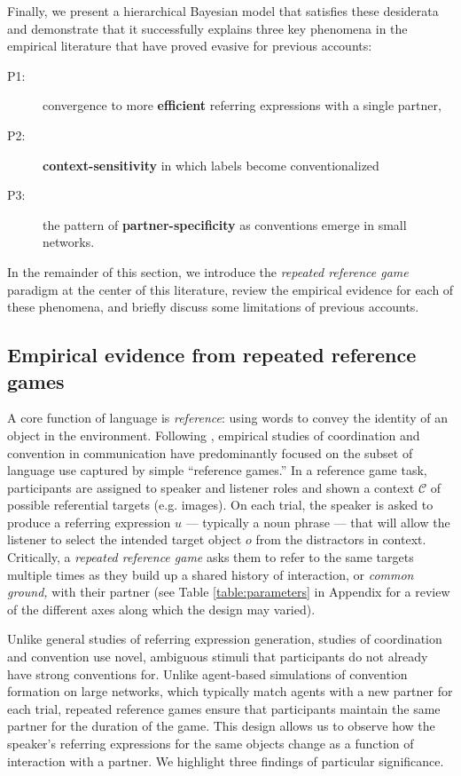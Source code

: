 Finally, we present a hierarchical Bayesian model that satisfies these desiderata and demonstrate that it successfully explains three key phenomena in the empirical literature that have proved evasive for previous accounts: 
\begin{description}
\item[P1:] convergence to more \textbf{efficient} referring expressions with a single partner, 
\item[P2:] \textbf{context-sensitivity} in which labels become conventionalized
\item[P3:] the pattern of \textbf{partner-specificity} as conventions emerge in small networks.
\end{description}
In the remainder of this section, we introduce the \emph{repeated reference game} paradigm at the center of this literature, review the empirical evidence for each of these phenomena, and briefly discuss some limitations of previous accounts.

\subsection{Empirical evidence from repeated reference games}

A core function of language is \emph{reference}: using words to convey the identity of an object in the environment. 
Following , empirical studies of coordination and convention in communication have predominantly focused on the subset of language use captured by simple ``reference games.'' 
In a reference game task, participants are assigned to speaker and listener roles and shown a context $\mathcal{C}$ of possible referential targets (e.g. images).
On each trial, the speaker is asked to produce a referring expression $u$ --- typically a noun phrase --- that will allow the listener to select the intended target object $o$ from the distractors in context.
Critically, a \emph{repeated reference game} asks them to refer to the same targets multiple times as they build up a shared history of interaction, or \emph{common ground,} with their partner (see Table \ref{table:parameters} in Appendix for a review of the different axes along which the design may varied).

Unlike general studies of referring expression generation, studies of coordination and convention use novel, ambiguous stimuli that participants do not already have strong conventions for.
Unlike agent-based simulations of convention formation on large networks, which typically match agents with a new partner for each trial, repeated reference games ensure that participants maintain the same partner for the duration of the game.
This design allows us to observe how the speaker's referring expressions for the same objects change as a function of interaction with a partner.
We highlight three findings of particular significance.


